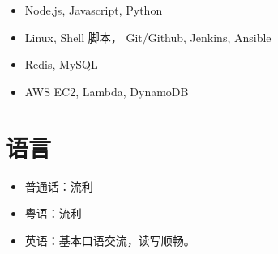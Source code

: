 \documentclass{resume}
\begin{document}
\begin{itemize}[parsep=0.5ex]
  \item Node.js, Javascript, Python
  \item Linux, Shell 脚本， Git/Github, Jenkins, Ansible
  \item Redis, MySQL
  \item AWS EC2, Lambda, DynamoDB
\end{itemize}


\section{语言}

\begin{itemize}[parsep=0.5ex]
  \item 普通话：流利
  \item 粤语：流利
  \item 英语：基本口语交流，读写顺畅。
\end{itemize}
\end{document}
